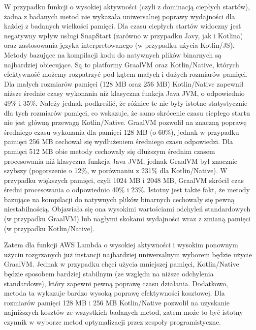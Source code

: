 W przypadku funkcji o wysokiej aktywności (czyli z dominacją ciepłych startów), żadna z badanych metod nie wykazała uniwersalnej poprawy wydajności dla każdej z badanych wielkości pamięci.
Dla czasu ciepłych startów widoczny jest negatywny wpływ usługi SnapStart (zarówno w przypadku Javy, jak i Kotlina) oraz zastosowania języka interpretowanego (w przypadku użycia Kotlin/JS).
Metody bazujące na kompilacji kodu do natywnych plików binarnych są najbardziej obiecujące.
Są to platformy GraalVM oraz Kotlin/Native, których efektywność możemy rozpatrzyć pod kątem małych i dużych rozmiarów pamięci.
Dla małych rozmiarów pamięci (128 MB oraz 256 MB) Kotlin/Native zapewnił niższe średnie czasy wykonania niż klasyczna funkcja Java JVM, o odpowiednio 49\% i 35\%.
Należy jednak podkreślić, że różnice te nie były istotne statystycznie dla tych rozmiarów pamięci, co wskazuje, że samo skrócenie czasu ciepłego startu nie jest główną przewagą Kotlin/Native.
GraalVM pozwolił na znaczną poprawę średniego czasu wykonania dla pamięci 128 MB (o 60\%), jednak w przypadku pamięci 256 MB cechował się wydłużeniem średniego czasu odpowiedzi.
Dla pamięci 512 MB obie metody cechowały się dłuższym średnim czasem procesowania niż klasyczna funkcja Java JVM, jednak GraalVM był znacznie szybszy (pogorszenie o 12\%, w porównaniu z 231\% dla Kotlin/Native).
W przypadku większych pamięci, czyli 1024 MB i 2048 MB, GraalVM skrócił czas średni procesowania o odpowiednio 40\% i 23\%.
Istotny jest także fakt, że metody bazujące na kompilacji do natywnych plików binarnych cechowały się pewną niestabilnością.
Objawiała się ona wysokimi wartościami odchyleń standardowych (w przypadku GraalVM) lub nagłymi skokami wydajności wraz z zmianą pamięci (w przypadku Kotlin/Native).

Zatem dla funkcji AWS Lambda o wysokiej aktywności i wysokim ponownym użyciu rozgrzanych już instancji najbardziej uniwersalnym wyborem będzie użycie GraalVM.
Jednak w przypadku chęci użycia mniejszej pamięci, Kotlin/Native będzie sposobem bardziej stabilnym (ze względu na niższe odchylenia standardowe), który zapewni pewną poprawę czasu działania.
Dodatkowo, metoda ta wykazuje bardzo wysoką poprawę efektywności kosztowej.
Dla rozmiarów pamięci 128 MB i 256 MB Kotlin/Native pozwolił na uzyskanie najniższych kosztów ze wszystkich badanych metod, zatem może to być istotny czynnik w wyborze metod optymalizacji przez zespoły programistyczne.

